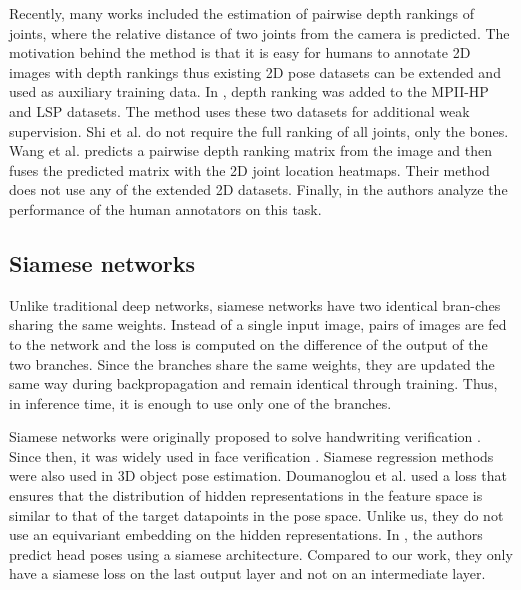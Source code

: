 \documentclass[preprint]{elsarticle}
\begin{document}
Recently, many works included the estimation of pairwise depth rankings of joints, where the relative distance of two joints from the camera is predicted. The motivation behind the method is that it is easy for humans to annotate 2D images with depth rankings thus existing 2D pose datasets \cite{mpii-hp,lsp} can be extended and used as auxiliary training data. In \cite{pavlakos2018ordinal}, depth ranking was added to the MPII-HP and LSP datasets. The method uses these two datasets for additional weak supervision. Shi et al. \cite{fbipose} do not require the full ranking of all joints, only the bones. Wang et al. \cite{drpose}  predicts a pairwise depth ranking matrix from the image and then fuses the predicted matrix with the 2D joint location heatmaps. Their method does not use any of the extended 2D datasets. Finally, in \cite{ronchi2018allrelative} the authors analyze the performance of the human annotators on this task.

\subsection{Siamese networks}
Unlike traditional deep networks, siamese networks have two identical bran-ches sharing the same weights. Instead of a single input image, pairs of images are fed to the network and the loss is computed on the difference of the output of the two branches. Since the branches share the same weights, they are updated the same way during backpropagation and remain identical through training. Thus, in inference time, it is enough to use only one of the branches.

Siamese networks were originally proposed to solve handwriting verification \cite{siameseSignature}. Since then, it was widely used in face verification \cite{facenet,deepid2}. Siamese regression methods were also used in 3D object pose estimation. Doumanoglou et al. \cite{doumanoglouSiamesePose} used a loss that ensures that the distribution of hidden representations in the feature space is similar to that of the target datapoints in the pose space. Unlike us, they do not use an equivariant embedding on the hidden representations. In \cite{siamese_headpose}, the authors predict head poses using a siamese architecture. Compared to our work, they only have a siamese loss on the last output layer and not on an intermediate layer.
\end{document}
